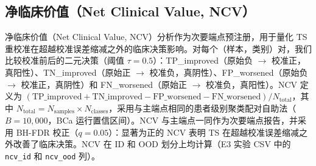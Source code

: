\subsection{净临床价值（Net Clinical Value, NCV）}
\label{sec:ncv_methods}
净临床价值（Net Clinical Value, NCV）分析作为次要端点预注册，用于量化 TS 重校准在超越校准误差缩减之外的临床决策影响。对每个（样本，类别）对，我们比较校准前后的二元决策（阈值 $\tau=0.5$）：TP\_improved（原始负 $\to$ 校准正，真阳性）、TN\_improved（原始正 $\to$ 校准负，真阴性）、FP\_worsened（原始负 $\to$ 校准正，真阴性）和 FN\_worsened（原始正 $\to$ 校准负，真阳性）。NCV 定义为 $(\text{TP\_improved} + \text{TN\_improved} - \text{FP\_worsened} - \text{FN\_worsened}) / N_{\text{total}}$，其中 $N_{\text{total}} = N_{\text{samples}} \times N_{\text{classes}}$，采用与主端点相同的患者级别聚类配对自助法（$B=10{,}000$，BCa 运行置信区间）。NCV 与主端点一同作为次要端点报告，并采用 BH-FDR 校正（$q=0.05$）：显著为正的 NCV 表明 TS 在超越校准误差缩减之外改善了临床决策。NCV 在 ID 和 OOD 划分上均计算（E3 实验 CSV 中的 \texttt{ncv\_id} 和 \texttt{ncv\_ood} 列）。
